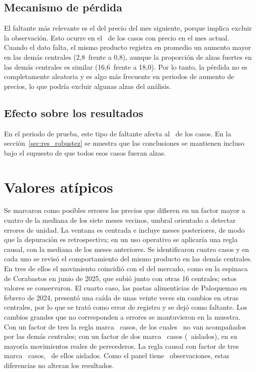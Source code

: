 \subsection*{Mecanismo de pérdida}

El faltante más relevante es el del precio del mes siguiente, porque implica excluir la observación. Esto ocurre en el \cfatasa\pct\ de los casos con precio en el mes actual. Cuando el dato falta, el mismo producto registra en promedio un aumento mayor en las demás centrales (2,8\pct\ frente a 0,8\pct), aunque la proporción de alzas fuertes en las demás centrales es similar (16,6\pct\ frente a 18,0\pct). Por lo tanto, la pérdida no es completamente aleatoria y es algo más frecuente en periodos de aumento de precios, lo que podría excluir algunas alzas del análisis.

\subsection*{Efecto sobre los resultados}

En el periodo de prueba, este tipo de faltante afecta al \cfatasap\pct\ de los casos. En la sección~\ref{sec:res_robustez} se muestra que las conclusiones se mantienen incluso bajo el supuesto de que todos esos casos fueran alzas.

\section{Valores atípicos}
\label{sec:atipicos}

Se marcaron como posibles errores los precios que difieren en un factor mayor a cuatro de la mediana de los siete meses vecinos, umbral orientado a detectar errores de unidad. La ventana es centrada e incluye meses posteriores, de modo que la depuración es retrospectiva; en un uso operativo se aplicaría una regla causal, con la mediana de los meses anteriores. Se identificaron cuatro casos y en cada uno se revisó el comportamiento del mismo producto en las demás centrales. En tres de ellos el movimiento coincidió con el del mercado, como en la espinaca de Corabastos en junio de 2025, que subió junto con otras 16 centrales; estos valores se conservaron. El cuarto caso, las pastas alimenticias de Paloquemao en febrero de 2024, presentó una caída de unas veinte veces sin cambios en otras centrales, por lo que se trató como error de registro y se dejó como faltante. Los cambios grandes que no corresponden a errores se mantuvieron en la muestra. Con un factor de tres la regla marca \rvatcenttres\ casos, de los cuales \rvatcenttresais\ no van acompañados por las demás centrales; con un factor de dos marca \rvatcentdos\ casos (\rvatcentdosais\ aislados), en su mayoría movimientos reales de perecederos. La regla causal con factor de tres marca \rvatcaustres\ casos, \rvatcaustresais\ de ellos aislados. Como el panel tiene \cfilas\ observaciones, estas diferencias no alteran los resultados.

